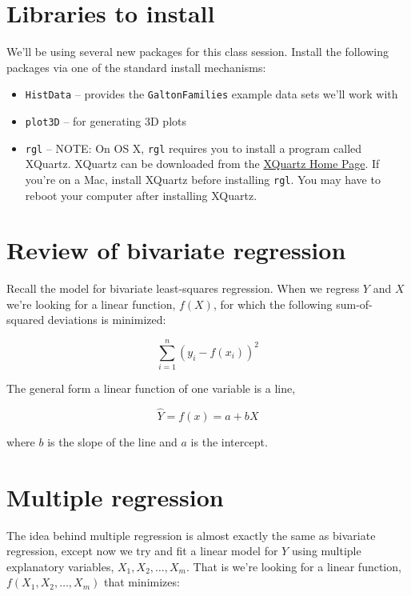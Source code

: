 \documentclass[]{book}
\providecommand{\tightlist}{%
  \setlength{\itemsep}{0pt}\setlength{\parskip}{0pt}}
\theoremstyle{definition}
\theoremstyle{definition}
\theoremstyle{definition}
\theoremstyle{remark}
\begin{document}
\hypertarget{libraries-to-install}{%
\section{Libraries to install}\label{libraries-to-install}}

We'll be using several new packages for this class session. Install the
following packages via one of the standard install mechanisms:

\begin{itemize}
\tightlist
\item
  \texttt{HistData} -- provides the \texttt{GaltonFamilies} example data
  sets we'll work with
\item
  \texttt{plot3D} -- for generating 3D plots
\item
  \texttt{rgl} -- NOTE: On OS X, \texttt{rgl} requires you to install a
  program called XQuartz. XQuartz can be downloaded from the
  \href{https://www.xquartz.org}{XQuartz Home Page}. If you're on a Mac,
  install XQuartz before installing \texttt{rgl}. You may have to reboot
  your computer after installing XQuartz.
\end{itemize}

\hypertarget{review-of-bivariate-regression}{%
\section{Review of bivariate
regression}\label{review-of-bivariate-regression}}

Recall the model for bivariate least-squares regression. When we regress
\(Y\) and \(X\) we're looking for a linear function, \(f(X)\), for which
the following sum-of-squared deviations is minimized:

\[
\sum_{i=1}^n (y_i - f(x_i))^2
\]

The general form a linear function of one variable is a line,

\[
\widehat{Y} = f(x)  = a + bX
\]

where \(b\) is the slope of the line and \(a\) is the intercept.

\hypertarget{multiple-regression-1}{%
\section{Multiple regression}\label{multiple-regression-1}}

The idea behind multiple regression is almost exactly the same as
bivariate regression, except now we try and fit a linear model for \(Y\)
using multiple explanatory variables, \(X_1, X_2,\ldots, X_m\). That is
we're looking for a linear function, \(f(X_1, X_2,\ldots,X_m)\) that
minimizes:
\end{document}
